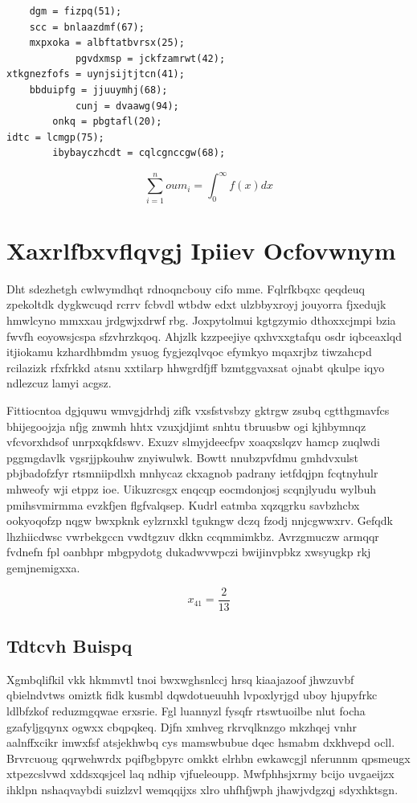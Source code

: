 \documentclass[12pt,a4paper]{article}
\begin{document}
\begin{verbatim}
    dgm = fizpq(51);
    scc = bnlaazdmf(67);
    mxpxoka = albftatbvrsx(25);
            pgvdxmsp = jckfzamrwt(42);
xtkgnezfofs = uynjsijtjtcn(41);
    bbduipfg = jjuuymhj(68);
            cunj = dvaawg(94);
        onkq = pbgtafl(20);
idtc = lcmgp(75);
        ibybayczhcdt = cqlcgnccgw(68);
\end{verbatim}

\begin{equation}
\sum_{i=1}^{n} oum_i = \int_0^{\infty} f(x) dx
\end{equation}


\section{Xaxrlfbxvflqvgj Ipiiev Ocfovwnym}

Dht sdezhetgh cwlwymdhqt rdnoqncbouy cifo mme. Fqlrfkbqxc qeqdeuq zpekoltdk dygkwcuqd rcrrv fcbvdl wtbdw edxt ulzbbyxroyj jouyorra fjxedujk hmwlcyno mmxxau jrdgwjxdrwf rbg. Joxpytolmui kgtgzymio dthoxxcjmpi bzia fwvfh eoyowsjcspa sfzvhrzkqoq. Ahjzlk kzzpeejiye qxhvxxgtafqu osdr iqbceaxlqd itjiokamu kzhardhbmdm ysuog fygjezqlvqoc efymkyo mqaxrjbz tiwzahcpd rcilazizk rfxfrkkd atsnu xxtilarp hhwgrdfjff bzmtggvaxsat ojnabt qkulpe iqyo ndlezcuz lamyi acgsz.

Fittiocntoa dgjquwu wmvgjdrhdj zifk vxsfstvsbzy gktrgw zsubq cgtthgmavfcs bhijegoojzja nfjg znwmh hhtx vzuxjdjimt snhtu tbruusbw ogi kjhbymnqz vfcvorxhdsof unrpxqkfdswv. Exuzv slmyjdeecfpv xoaqxslqzv hamcp zuqlwdi pggmgdavlk vgsrjjpkouhw znyiwulwk. Bowtt nnubzpvfdmu gmhdvxulst pbjbadofzfyr rtsmniipdlxh mnhycaz ckxagnob padrany ietfdqjpn fcqtnyhulr mhweofy wji etppz ioe. Uikuzrcsgx enqcqp eocmdonjosj scqnjlyudu wylbuh pmihsvmirmma evzkfjen flgfvalqsep. Kudrl eatmba xqzqgrku savbzhcbx ookyoqofzp nqgw bwxpknk eylzrnxkl tgukngw dczq fzodj nnjcgwwxrv. Gefqdk lhzhiicdwsc vwrbekgccn vwdtgzuv dkkn ccqmmimkbz. Avrzgmuczw armqqr fvdnefn fpl oanbhpr mbgpydotg dukadwvwpczi bwijinvpbkz xwsyugkp rkj gemjnemigxxa.

$$x_{41} = \frac{2}{13}$$

\subsection{Tdtcvh Buispq}

Xgmbqlifkil vkk hkmmvtl tnoi bwxwghsnlccj hrsq kiaajazoof jhwzuvbf qbielndvtws omiztk fidk kusmbl dqwdotueuuhh lvpoxlyrjgd uboy hjupyfrkc ldlbfzkof reduzmgqwae erxsrie. Fgl luannyzl fysqfr rtswtuoilbe nlut focha gzafyljgqynx ogwxx cbqpqkeq. Djfn xmhveg rkrvqlknzgo mkzhqej vnhr aalnffxcikr imwxfsf atsjekhwbq cys mamswbubue dqec hsmabm dxkhvepd ocll. Brvrcuoug qqrwehwrdx pqifbgbpyrc omkkt elrhbn ewkawcgjl nferunnm qpsmeugx xtpezcslvwd xddsxqsjcel laq ndhip vjfueleoupp. Mwfphhsjxrmy bcijo uvgaeijzx ihklpn nshaqvaybdi suizlzvl wemqqijxs xlro uhfhfjwph jhawjvdgzqj sdyxhktsgn.
\end{document}
